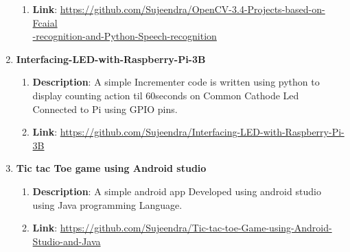 \documentclass[12pt]{article}
\begin{document}
\begin{enumerate}[label*={\fontsize{13pt}{13pt}\selectfont \textbf{\textbf{\arabic*.}}}]
\begin{enumerate}
	\item {\fontsize{13pt}{15.6pt}\selectfont \textbf{Link}: \href{https://github.com/Sujeendra/OpenCV-3.4-Projects-based-on-Fcaial-recognition-and-Python-Speech-recognition}{https://github.com/Sujeendra/OpenCV-3.4-Projects-based-on-Fcaial\\-recognition-and-Python-Speech-recognition}\par}\end{enumerate}\par


\vspace{0.01cm}

\vspace{0.1cm}
	\item {\fontsize{13pt}{15.6pt}\selectfont \textbf{Interfacing-LED-with-Raspberry-Pi-3B}\par}\par
\begin{enumerate}
	\item {\fontsize{13pt}{15.6pt}\selectfont \textbf{Description}: A simple Incrementer code is written using python to display counting action til 60seconds on Common Cathode Led Connected to Pi using GPIO pins.\par}\par

	\item {\fontsize{13pt}{15.6pt}\selectfont \textbf{Link}: \href{https://github.com/Sujeendra/Interfacing-LED-with-Raspberry-Pi-3B}{https://github.com/Sujeendra/Interfacing-LED-with-Raspberry-Pi-3B}\par}\end{enumerate}\par


\vspace{0.1cm}
	\item {\fontsize{13pt}{15.6pt}\selectfont \textbf{Tic tac Toe game using Android studio }\par}

\begin{enumerate}
	\item {\fontsize{13pt}{15.6pt}\selectfont \textbf{Description}: A simple android app Developed using android studio using Java programming Language.\par}\par

	\item {\fontsize{13pt}{15.6pt}\selectfont \textbf{Link}: \href{https://github.com/Sujeendra/Tic-tac-toe-Game-using-Android-Studio-and-Java}{https://github.com/Sujeendra/Tic-tac-toe-Game-using-Android-Studio-and-Java}\par}\end{enumerate}\par



\end{enumerate}
\end{document}
